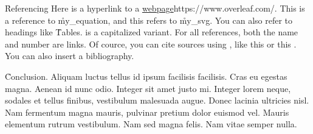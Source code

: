 \documentclass[twocolumn]{paper}
\begin{document}


\h{Referencing}
Here is a hyperlink to a \url{webpage}{https://www.overleaf.com/}. This is a reference to \r{my_equation}, and this refers to \r{my_svg}. You can also refer to headings like \r{Tables}.  is a capitalized variant. For all references, both the name and number are links. Of cource, you can cite sources using \c{\cite{...}}, like this \cite{minted} or this \cite{tabularray}. You can also insert a bibliography.

\h{Conclusion}.
Aliquam luctus tellus id ipsum facilisis facilisis. Cras eu egestas magna. Aenean id nunc odio. Integer sit amet justo mi. Integer lorem neque, sodales et tellus finibus, vestibulum malesuada augue. Donec lacinia ultricies nisl. Nam fermentum magna mauris, pulvinar pretium dolor euismod vel. Mauris elementum rutrum vestibulum. Nam sed magna felis. Nam vitae semper nulla.

\toc

\end{document}
